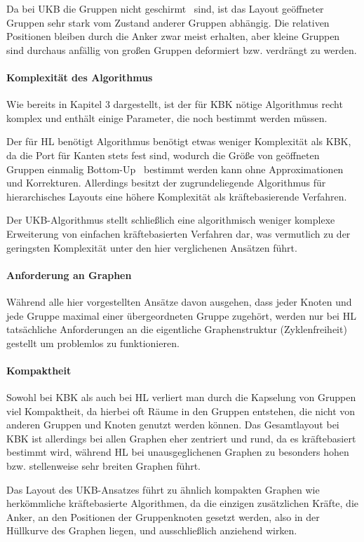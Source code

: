 Da bei UKB die Gruppen nicht \glqq geschirmt \grqq\ sind, ist das Layout geöffneter Gruppen sehr stark vom Zustand anderer Gruppen abhängig. Die relativen Positionen bleiben durch die Anker zwar meist erhalten, aber kleine Gruppen sind durchaus anfällig von großen Gruppen deformiert bzw. verdrängt zu werden.

\paragraph*{Komplexität des Algorithmus}
Wie bereits in Kapitel 3 dargestellt, ist der für KBK nötige Algorithmus recht komplex und enthält einige Parameter, die noch bestimmt werden müssen.

Der für HL benötigt Algorithmus benötigt etwas weniger Komplexität als KBK, da die Port für Kanten stets fest sind, wodurch die Größe von geöffneten Gruppen einmalig \glqq Bottom-Up \grqq\ bestimmt werden kann ohne Approximationen und Korrekturen. Allerdings besitzt der zugrundeliegende Algorithmus für hierarchisches Layouts eine höhere Komplexität als kräftebasierende Verfahren.

Der UKB-Algorithmus stellt schließlich eine algorithmisch weniger komplexe Erweiterung von einfachen kräftebasierten Verfahren dar, was vermutlich zu der geringsten Komplexität unter den hier verglichenen Ansätzen führt.

\paragraph*{Anforderung an Graphen}
Während alle hier vorgestellten Ansätze davon ausgehen, dass jeder Knoten und jede Gruppe maximal einer übergeordneten Gruppe zugehört, werden nur bei HL tatsächliche Anforderungen an die eigentliche Graphenstruktur (Zyklenfreiheit) gestellt um problemlos zu funktionieren.

\paragraph*{Kompaktheit}
Sowohl bei KBK als auch bei HL verliert man durch die Kapselung von Gruppen viel Kompaktheit, da hierbei oft Räume in den Gruppen entstehen, die nicht von anderen Gruppen und Knoten genutzt werden können. Das Gesamtlayout bei KBK ist allerdings bei allen Graphen eher zentriert und rund, da es kräftebasiert bestimmt wird, während HL bei unausgeglichenen Graphen zu besonders hohen bzw. stellenweise sehr breiten Graphen führt.

Das Layout des UKB-Ansatzes führt zu ähnlich kompakten Graphen wie herkömmliche kräftebasierte Algorithmen, da die einzigen zusätzlichen Kräfte, die Anker, an den Positionen der Gruppenknoten gesetzt werden, also in der Hüllkurve des Graphen liegen, und ausschließlich anziehend wirken.

